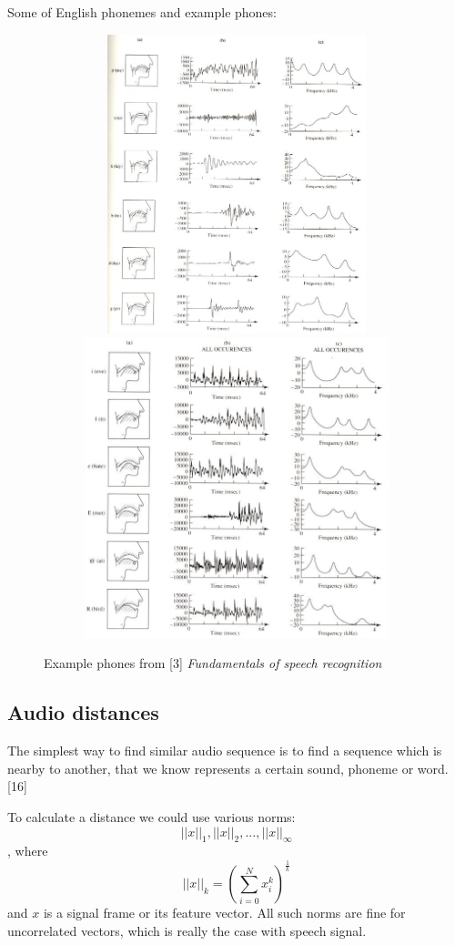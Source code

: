 \documentclass[12pt,a4paper,english]{article}
\begin{document}
\newpage
Some of English phonemes and example phones:
\begin{figure}[hb]
    \centering
    \includegraphics[height=8.7cm, width=13cm]{example_phones_1.jpg}
    \includegraphics[height=8.7cm, width=13cm]{example_phones_2.jpg}
    \caption[]{Example phones from [3] \emph{Fundamentals of speech recognition}}
\end{figure}

\newpage
\subsection{Audio distances}

The simplest way to find similar audio sequence is to find a sequence which is nearby to another,
that we know represents a certain sound, phoneme or word. [16] \newline

To calculate a distance we could use various norms:
\begin{equation}
    ||x||_1 , || x ||_2, ... , || x ||_\infty
\end{equation}
, where 
\begin{equation}
    ||x||_k = (\sum_{i=0}^{N} x_i^k)^\frac{1}{k}
\end{equation}
and $x$ is a signal frame or its feature vector. \newline
All such norms are fine for uncorrelated vectors, which is really the case with speech signal. \newline
\end{document}
